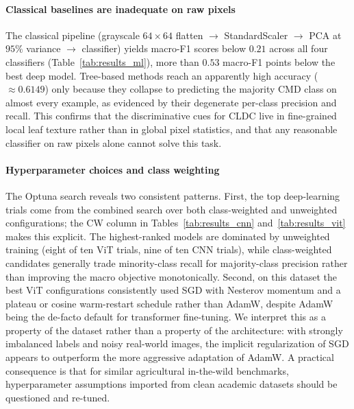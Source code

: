 \documentclass[conference]{IEEEtran}
\begin{document}
\paragraph{Classical baselines are inadequate on raw pixels}
The classical pipeline (grayscale $64{\times}64$ flatten $\rightarrow$ StandardScaler $\rightarrow$ PCA at $95\%$ variance $\rightarrow$ classifier) yields macro-F1 scores below $0.21$ across all four classifiers (Table~\ref{tab:results_ml}), more than $0.53$ macro-F1 points below the best deep model. Tree-based methods reach an apparently high accuracy ($\approx 0.6149$) only because they collapse to predicting the majority CMD class on almost every example, as evidenced by their degenerate per-class precision and recall. This confirms that the discriminative cues for CLDC live in fine-grained local leaf texture rather than in global pixel statistics, and that any reasonable classifier on raw pixels alone cannot solve this task.

\paragraph{Hyperparameter choices and class weighting}
The Optuna search reveals two consistent patterns. First, the top deep-learning trials come from the combined search over both class-weighted and unweighted configurations; the CW column in Tables~\ref{tab:results_cnn} and~\ref{tab:results_vit} makes this explicit. The highest-ranked models are dominated by unweighted training (eight of ten ViT trials, nine of ten CNN trials), while class-weighted candidates generally trade minority-class recall for majority-class precision rather than improving the macro objective monotonically. Second, on this dataset the best ViT configurations consistently used SGD with Nesterov momentum and a plateau or cosine warm-restart schedule rather than AdamW, despite AdamW being the de-facto default for transformer fine-tuning. We interpret this as a property of the dataset rather than a property of the architecture: with strongly imbalanced labels and noisy real-world images, the implicit regularization of SGD appears to outperform the more aggressive adaptation of AdamW. A practical consequence is that for similar agricultural in-the-wild benchmarks, hyperparameter assumptions imported from clean academic datasets should be questioned and re-tuned.
\end{document}
